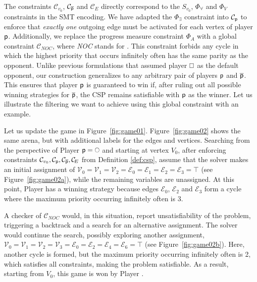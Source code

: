 \documentclass[letterpaper]{article} %
\begin{document}
The constraints $\mathcal{C}_{v_0}$, $\mathcal{C}_{\opponent}$ and $\mathcal{C}_{\!E}$ directly correspond to the $S_{v_0}$, $\Phi_\forall$ and $\Phi_V$ constraints in the SMT encoding. We have adapted the $\Phi_\exists$ constraint into $\mathcal{C}_{\player}$ to enforce that \emph{exactly one} outgoing edge must be activated for each vertex of player $\player$. Additionally, we replace the progress measure constraint $\Phi_A$ with a global constraint $\mathcal{C}_{\!N\!O\!C}$, where \textit{NOC} stands for \noc. This constraint forbids any cycle in which the highest priority that occurs infinitely often has the same parity as the opponent. Unlike previous formulations that assumed player $\odd$ as the default opponent, our construction generalizes to any arbitrary pair of players $\player$ and $\opponent$. This ensures that player $\player$ is guaranteed to win if, after ruling out all possible winning strategies for $\opponent$, the CSP remains satisfiable with $\player$ as the winner.
%
Let us illustrate the filtering we want to achieve using this global constraint with an example.

\begin{example}\label{exa:jurd-2-1-f0}
    Let us update the game in Figure~\ref{fig:game01}.  Figure~\ref{fig:game02} shows the same arena, but with additional labels for the edges and vertices. Searching from the perspective of Player $\player = \even$ and starting at vertex $V_0$, after enforcing constraints $\mathcal{C}_{v_0}, \mathcal{C}_{\player}, \mathcal{C}_{\opponent}, \mathcal{C}_{\!E}$ from Definition \ref{def:csp}, assume that the solver makes an initial assignment of $\mathcal{V}_0 = \mathcal{V}_1 = \mathcal{V}_2 = \mathcal{E}_0 = \mathcal{E}_1 = \mathcal{E}_2 = \mathcal{E}_3 = \top$ (see Figure~\ref{fig:game02a}), while the remaining variables are unassigned. At this point, Player \odd has a winning strategy because edges $\mathcal{E}_0$, $\mathcal{E}_2$ and $\mathcal{E}_3$ form a cycle where the maximum priority occurring infinitely often is 3.

    A checker of $\mathcal{C}_{N\!O\!C}$ would, in this situation, report unsatisfiability of the problem, triggering a backtrack and a search for an alternative assignment. The solver would continue the search, possibly exploring another assignment, $\mathcal{V}_0 = \mathcal{V}_1 = \mathcal{V}_2 = \mathcal{V}_3 = \mathcal{E}_0 = \mathcal{E}_2 = \mathcal{E}_4 = \mathcal{E}_6 = \top$ (see Figure~\ref{fig:game02b}). Here, another cycle is formed, but the maximum priority occurring infinitely often is 2, which satisfies all constraints, making the problem satisfiable. As a result, starting from $V_0$, this game is won by Player \even.
\end{example}
\end{document}
